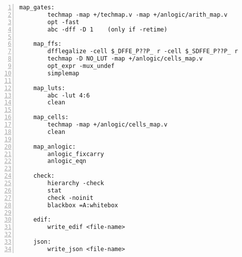 \begin{lstlisting}[numbers=left,frame=single]
    map_gates:
        techmap -map +/techmap.v -map +/anlogic/arith_map.v
        opt -fast
        abc -dff -D 1    (only if -retime)

    map_ffs:
        dfflegalize -cell $_DFFE_P??P_ r -cell $_SDFFE_P??P_ r -cell $_DLATCH_N??_ r
        techmap -D NO_LUT -map +/anlogic/cells_map.v
        opt_expr -mux_undef
        simplemap

    map_luts:
        abc -lut 4:6
        clean

    map_cells:
        techmap -map +/anlogic/cells_map.v
        clean

    map_anlogic:
        anlogic_fixcarry
        anlogic_eqn

    check:
        hierarchy -check
        stat
        check -noinit
        blackbox =A:whitebox

    edif:
        write_edif <file-name>

    json:
        write_json <file-name>
\end{lstlisting}

